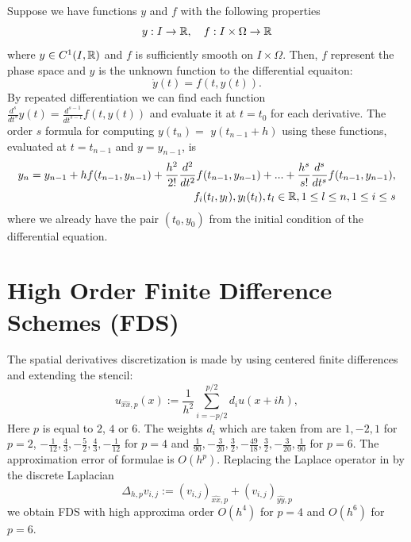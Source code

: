 \documentclass[a0,portrait]{a0poster}
\begin{document}
\begin{multicols}{2}
Suppose we have functions $y$ and $f$ with the following properties
\begin{equation}
y:I \rightarrow \mathbb{R}, \quad f:I \times \Omega \rightarrow \mathbb{R} \nonumber
\end{equation}
where $y \in C^1(I,\mathbb{R})$ and $f$ is sufficiently smooth on $I \times \Omega$. Then, $f$ represent the phase space and $y$ is the unknown function to the differential equaiton:
\begin{equation}
\dot{y}(t) = f(t, y(t)).
\end{equation}
By repeated differentiation we can find each function $\frac{d^s}{dt^s}y(t) = \frac{d^{s-1}}{dt^{s-1}}f(t, y(t))$ and evaluate it at $t=t_0$ for each derivative.
The order $s$ formula for computing $y(t_n)=$ $y(t_{n-1}+h)$ using these functions, evaluated at $t=t_{n-1}$ and $y=y_{n-1}$, is
\begin{eqnarray}
y_n = y_{n-1} + h f(t_{n-1}, y_{n-1}) + \frac{h^2}{2!} \frac{d^2}{dt^2} f(t_{n-1}, y_{n-1}) + ... + \frac{h^s}{s!} \frac{d^s}{dt^s} f(t_{n-1}, y_{n-1}), &\nonumber\\ 
f_i(t_l, y_l), y_l(t_l), t_l \in \mathbb{R}, 1 \leq l \leq n, 1 \leq i \leq s
\end{eqnarray}
where we already have the pair $(t_0, y_0)$ from the initial condition of the differential equation.

\section*{High Order Finite Difference Schemes (FDS)}
The spatial derivatives discretization  is made by using centered finite differences and extending the stencil:
\begin{equation}\label{fd}
u_{\widehat{xx},p}(x) :=  \frac{1}{h^2} \sum\limits_{i=-p/2}^{p/2} d_i u(x+ih),
\end{equation}
 Here $p$ is equal to $2$, $4$ or $6$.  The weights $d_i$ which are taken from \cite{forn} are  
 $ 1,-2,1$ for $p=2$, $-\frac{1}{12}, \frac{4}{3}, -\frac{5}{2}, \frac{4}{3}, -\frac{1}{12}$ for $p=4$ and  $\frac{1}{90}, -\frac{3}{20}, \frac{3}{2}, -\frac{49}{18}, \frac{3}{2}, -\frac{3}{20}, \frac{1}{90}$ for $p=6$. The approximation error of  formulae  is $O(h^p)$. Replacing the Laplace operator in  by the discrete Laplacian 
$$ \Delta_{h,p} v_{i,j} := (v_{i,j})_{\widehat{xx},p} + (v_{i,j})_{\widehat{yy},p}$$ 
we obtain FDS with high approxima order $O(h^4)$ for $p=4$ and  $O(h^6)$ for $p=6$.



\end{multicols}
\end{document}
